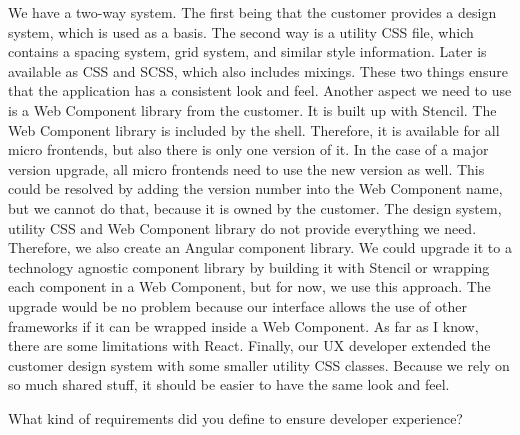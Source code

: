 \begin{description}
    \PirminRehm We have a two-way system. The first being that the customer provides a design system, which is used as a basis. The second way is a utility CSS file, which contains a spacing system, grid system, and similar style information. Later is available as CSS and SCSS, which also includes mixings. These two things ensure that the application has a consistent look and feel.
    Another aspect we need to use is a Web Component library from the customer. It is built up with Stencil. The Web Component library is included by the shell. Therefore, it is available for all micro frontends, but also there is only one version of it. In the case of a major version upgrade, all micro frontends need to use the new version as well. This could be resolved by adding the version number into the Web Component name, but we cannot do that, because it is owned by the customer.
    The design system, utility CSS and Web Component library do not provide everything we need. Therefore, we also create an Angular component library. We could upgrade it to a technology agnostic component library by building it with Stencil or wrapping each component in a Web Component, but for now, we use this approach. The upgrade would be no problem because our interface allows the use of other frameworks if it can be wrapped inside a Web Component. As far as I know, there are some limitations with React.
    Finally, our UX developer extended the customer design system with some smaller utility CSS classes. Because we rely on so much shared stuff, it should be easier to have the same look and feel.

    \NicoVogel What kind of requirements did you define to ensure developer experience?


\end{description}
